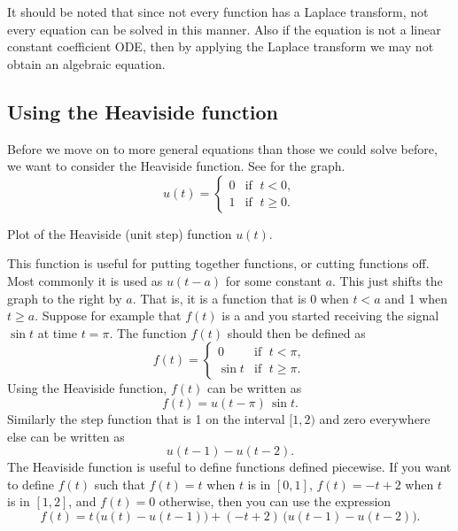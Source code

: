 It should be noted that since not every function has a Laplace transform,
not every equation can be solved in this manner.  Also if the equation
is not a linear constant coefficient ODE\@,
then by applying the Laplace transform we may not
obtain an algebraic equation.

\subsection{Using the Heaviside function}

Before we move on to more general equations
than those we could solve before,
we want to consider the Heaviside function.  See 
for the graph.
\begin{equation*}
u(t) =
\begin{cases}
0 & \text{if } \; t < 0 , \\ 
1 & \text{if } \; t \geq 0 .
\end{cases}
\end{equation*}

\begin{myfig}
\capstart
{}
\caption{Plot of the Heaviside (unit step) function
$u(t)$.\label{lt:heavisidefig}}
\end{myfig}

This function is useful for
putting together functions, or cutting functions off.  Most commonly it is
used as $u(t-a)$ for some constant $a$.  This just shifts the graph to the
right by $a$.  That is, it is a function that is 0 when $t < a$ and 1
when $t \geq a$.  Suppose for example that $f(t)$ is a  and
you started receiving the signal
$\sin t$ at time $t=\pi$.  The function $f(t)$ should then be defined as
\begin{equation*}
f(t) =
\begin{cases}
0 & \text{if } \; t < \pi , \\ 
\sin t & \text{if } \; t \geq \pi .
\end{cases}
\end{equation*}
Using the Heaviside function, $f(t)$ can
be written as
\begin{equation*}
f(t) = u(t - \pi) \, \sin t .
\end{equation*}
Similarly the step function that is 1 on the interval $[1,2)$ and zero
everywhere else can be written as
\begin{equation*}
u(t - 1) - u(t-2) .
\end{equation*}
The Heaviside function is useful to define functions defined piecewise.  If
you want to define $f(t)$ such that $f(t) = t$ when $t$ is in $[0,1]$,
$f(t) = -t+2$
when $t$ is in $[1,2]$, and $f(t) = 0$ otherwise, then you can use the expression
\begin{equation*}
f(t) = t \, \bigl( u(t) - u(t-1) \bigr) + 
(-t+2) \, \bigl( u(t - 1) - u(t-2) \bigr) .
\end{equation*}


